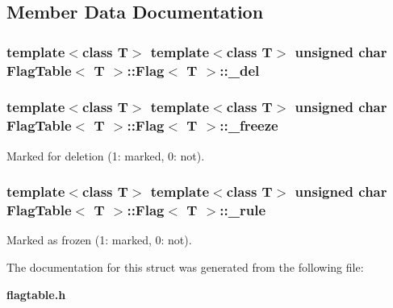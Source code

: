 \subsection{Member Data Documentation}
\subsubsection{\setlength{\rightskip}{0pt plus 5cm}template$<$class T$>$ template$<$class T$>$ unsigned char {\bf Flag\-Table}$<$ T $>$::{\bf Flag}$<$ T $>$::{\bf \_\-del}}\label{structFlagTable_1_1Flag_o0}


\subsubsection{\setlength{\rightskip}{0pt plus 5cm}template$<$class T$>$ template$<$class T$>$ unsigned char {\bf Flag\-Table}$<$ T $>$::{\bf Flag}$<$ T $>$::{\bf \_\-freeze}}\label{structFlagTable_1_1Flag_o1}


Marked for deletion (1: marked, 0: not). 

\subsubsection{\setlength{\rightskip}{0pt plus 5cm}template$<$class T$>$ template$<$class T$>$ unsigned char {\bf Flag\-Table}$<$ T $>$::{\bf Flag}$<$ T $>$::{\bf \_\-rule}}\label{structFlagTable_1_1Flag_o2}


Marked as frozen (1: marked, 0: not). 



The documentation for this struct was generated from the following file:\begin{CompactItemize}
\item 
{\bf flagtable.h}\end{CompactItemize}
